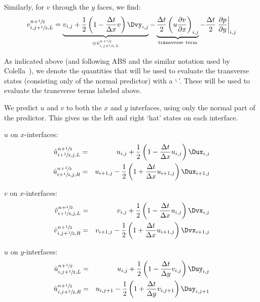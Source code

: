 Similarly, for $v$ through the $y$ faces, we find:
\begin{equation}
v_{i,j+\myhalf,L}^{n+\myhalf}
    = \underbrace{v_{i,j} + \frac{1}{2} \left ( 1 - \frac{\Delta t}{\Delta x} v \right ) \Dvy_{i,j}}_{\equiv \hat{v}_{i,j+\myhalf,L}^{n+\myhalf}}
    - \underbrace{\frac{\Delta t}{2} \left ( u \frac{\partial v}{\partial x} \right )_{i,j}}_{\mathrm{transverse~term}}
    - \frac{\Delta t}{2} \left . \frac{\partial p}{\partial y} \right |_{i,j}
\label{eq:vMAC_l}
\end{equation}

As indicated above (and following ABS and the similar notation used by
Colella~\cite{colella:1990}), we denote the quantities that will be used to evaluate
the transverse states (consisting only of the normal predictor) with a
`$\hat{~}$'.  These will be used to evaluate the transverse terms
labeled above.

We predict $u$ and $v$ to both the $x$ and $y$ interfaces, using only
the normal part of the predictor.  This gives us the left and right `hat'
states on each interface.

\noindent $u$ on $x$-interfaces:
\begin{eqnarray}
\hat{u}_{i+\myhalf,j,L}^{n+\myhalf} &=&
   u_{i,j} + \frac{1}{2} \left ( 1 - \frac{\Delta t}{\Delta x} u_{i,j} \right )
       \Dux_{i,j} \\
%
\hat{u}_{i+\myhalf,j,R}^{n+\myhalf} &=&
   u_{i+1,j} - \frac{1}{2} \left ( 1 + \frac{\Delta t}{\Delta x} u_{i+1,j} \right )
       \Dux_{i+1,j}
\end{eqnarray}

\noindent $v$ on $x$-interfaces:
\begin{eqnarray}
\hat{v}_{i+\myhalf,j,L}^{n+\myhalf} &=&
   v_{i,j} + \frac{1}{2} \left ( 1 - \frac{\Delta t}{\Delta x} u_{i,j} \right )
       \Dvx_{i,j} \\
%
\hat{v}_{i,j+\myhalf,R}^{n+\myhalf} &=&
   v_{i+1,j} - \frac{1}{2} \left ( 1 + \frac{\Delta t}{\Delta x} u_{i+1,j} \right )
       \Dvx_{i+1,j}
\end{eqnarray}

\noindent $u$ on $y$-interfaces:
\begin{eqnarray}
\hat{u}_{i,j+\myhalf,L}^{n+\myhalf} &=&
   u_{i,j} + \frac{1}{2} \left ( 1 - \frac{\Delta t}{\Delta y} v_{i,j} \right )
       \Duy_{i,j} \\
%
\hat{u}_{i,j+\myhalf,R}^{n+\myhalf} &=&
   u_{i,j+1} - \frac{1}{2} \left ( 1 + \frac{\Delta t}{\Delta y} v_{i,j+1} \right )
       \Duy_{i,j+1}
\end{eqnarray}


